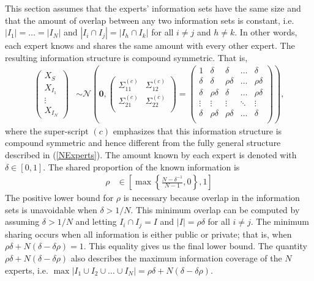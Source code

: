 \documentclass[11pt,twoside]{article}
\theoremstyle{definition}
\theoremstyle{definition}
\begin{document}
This section assumes that the experts' information sets have the same size and that the amount of overlap between any two information sets is constant, i.e.  $|I_{1}| =  \dots = |I_{N}|$ and $|I_{i} \cap I_{j}| = |I_{h} \cap I_{k}|$ for all $i \neq j$ and $h \neq k$. In other words, each expert knows and shares the same amount with every other expert. The resulting information structure is compound symmetric. That is,
\begin{align*}
\left(\begin{matrix} X_{S} \\ X_{I_1}\\ \vdots \\ X_{I_N} \end{matrix}\right) &\sim \mathcal{N}\left( 
 \boldsymbol{0}, \left(\begin{matrix} 
\Sigma_{11}^{(c)} & \Sigma_{12}^{(c)}\\
\Sigma_{21}^{(c)} & \Sigma_{22}^{(c)}\\
 \end{matrix}\right) 
 =
 \left(\begin{array}{c|cccc}
1 & \delta & \delta & \dots & \delta  \\ \hline
\delta & \delta &\rho\delta & \dots & \rho\delta   \\ 
\delta & \rho\delta & \delta & \dots & \rho\delta  \\ 
\vdots & \vdots & \vdots & \ddots & \vdots  \\ 
\delta & \rho\delta & \rho\delta & \dots & \delta\\ 
 \end{array}\right)\right),
\end{align*}
where the super-script $(c)$ emphasizes that this information structure is compound symmetric and hence different from the fully general structure described in (\ref{NExperts}). The amount known by each expert is denoted with $\delta \in [0,1]$. The shared proportion of the known information is 
\begin{align}
\rho &\in \left[  \max \left\{ \frac{N-\delta^{-1}}{N-1}, 0\right\}, 1 \right] \label{rhoDomain}
\end{align}
The positive lower bound for $\rho$ is necessary because overlap in the information sets is unavoidable when $\delta > 1/N$. This minimum overlap can be computed by assuming $\delta > 1/N$ and letting $I_{i} \cap I_j = I$ and $|I| =  \rho \delta$ for all $i \neq j$. The minimum sharing occurs when all information is either public or private; that is, when $\rho\delta + N(\delta - \delta\rho) = 1$. This equality gives us the final lower bound. The quantity  $\rho\delta + N(\delta - \delta\rho)$ also describes the maximum information coverage of the $N$ experts, i.e. $\max | I_1 \cup I_2 \cup \dots \cup I_N| = \rho\delta + N(\delta - \delta\rho)$. 
\end{document}

